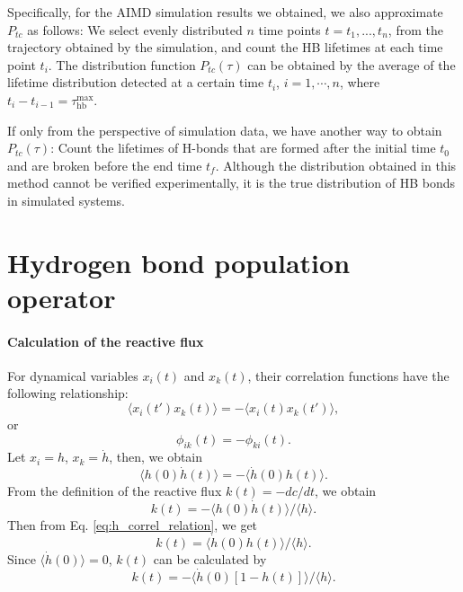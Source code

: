 {Specifically, for the AIMD simulation results we obtained, we also approximate $P_{tc}$ as follows: 
We select evenly distributed $n$ time points $t=t_1,...,t_n$, from the trajectory obtained by the simulation, 
and count the HB lifetimes at each time point $t_i$.
The distribution function $P_{tc}(\tau)$ 
can be obtained by the average of the lifetime distribution detected at a certain time $t_i$, $i=1,\cdots, n$, 
where $t_i-t_{i-1} = \tau_\text{hb}^{\max}$. 

If only from the perspective of simulation data, we have another way to obtain $P_{tc}(\tau)$: 
Count the lifetimes of H-bonds that are formed after the initial time $t_0$ and are broken before the end time $t_f$.
Although the distribution obtained in this method cannot be verified experimentally, 
it is the true distribution of HB bonds in simulated systems. 

\section{Hydrogen bond population operator}\label{hbpo}
\paragraph{Calculation of the reactive flux}\label{calc_rf}
For dynamical variables $x_i(t)$ and $x_k(t)$, their correlation functions have the following relationship:\cite{Landau1980}
\begin{equation}
\langle x_i(t') x_k(t)\rangle = -\langle x_i(t) x_k(t')\rangle,
\label{eq:correlation_relation}
\end{equation}
or 
\begin{equation}
\phi_{ik}(t) = -\phi_{ki}(t). \nonumber
\label{eq:correlation_relation2}
\end{equation}
Let $x_i = h$, $x_k = \dot h$,
then, we obtain
\begin{equation}
\langle h(0) \dot{h}(t)\rangle=-\langle\dot{h}(0) h(t)\rangle. 
\label{eq:h_correl_relation}
\end{equation}
From the definition of the reactive flux $k(t) = -dc/dt$, we obtain 
\begin{equation}
k(t)=-\langle h(0) \dot{h}(t)\rangle /\langle h\rangle. 
\label{eq:rf1}
\end{equation}
Then from Eq. \ref{eq:h_correl_relation},
we get 
\begin{equation}
k(t) =  \langle \dot{h}(0)h(t)\rangle /\langle h\rangle. \nonumber
\label{eq:rf2}
\end{equation}
Since $\langle\dot{h}(0)\rangle=0$, $k(t)$ can be calculated by
\begin{equation}
k(t) = - \langle \dot{h}(0)[1-h(t)]\rangle /\langle h\rangle.
\label{eq:rf3}
\end{equation}


}
